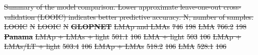 \documentclass[
  12pt,
]{article}
\providecommand{\DIFdeltex}[1]{{\protect\color{red}\sout{#1}}}                      %
\providecommand{\DIFdelbegin}{} %
\providecommand{\DIFdelend}{} %
\providecommand{\DIFdel}[1]{\texorpdfstring{\DIFdeltex{#1}}{}} %
\newcommand{\DIFscaledelfig}{0.5}
\newlength{\DIFdelgraphicswidth} %
\newlength{\DIFdelgraphicsheight} %
\newcommand{\DIFdelincludegraphics}[2][]{%
\sbox{\DIFdelgraphicsbox}{\DIFOincludegraphics[#1]{#2}}%
\settoboxwidth{\DIFdelgraphicswidth}{\DIFdelgraphicsbox} %
\settoboxtotalheight{\DIFdelgraphicsheight}{\DIFdelgraphicsbox} %
\scalebox{\DIFscaledelfig}{%
\parbox[b]{\DIFdelgraphicswidth}{\usebox{\DIFdelgraphicsbox}\\[-\baselineskip] \rule{\DIFdelgraphicswidth}{0em}}\llap{\resizebox{\DIFdelgraphicswidth}{\DIFdelgraphicsheight}{%
\setlength{\unitlength}{\DIFdelgraphicswidth}%
\begin{picture}(1,1)%
\thicklines\linethickness{2pt} %
{\color[rgb]{1,0,0}\put(0,0){\framebox(1,1){}}}%
{\color[rgb]{1,0,0}\put(0,0){\line( 1,1){1}}}%
{\color[rgb]{1,0,0}\put(0,1){\line(1,-1){1}}}%
\end{picture}%
}\hspace*{3pt}}} %
} %
\DeclareRobustCommand{\DIFdelbegin}{\DIFOdelbegin \let\includegraphics\DIFdelincludegraphics} %
\DeclareRobustCommand{\DIFdelend}{\DIFOaddend \let\includegraphics\DIFOincludegraphics} %
\begin{document}
\DIFdelbegin %
{%
\DIFdel{Summary of the model comparison. Lower approximate leave-one-out cross-validation (LOOIC) indicates better predictive accuracy. N; number of samples.}}%
\DIFdel{LOOIC }%
\DIFdel{N }%
\DIFdel{LOOIC }%
\DIFdel{N }%
\textbf{\DIFdel{GLOPNET}} %
\DIFdel{LMAp and LMAs }%
\DIFdel{746 }%
\DIFdel{198 }%
\DIFdel{LMA }%
\DIFdel{766.2 }%
\DIFdel{198 }%
\textbf{\DIFdel{Panama}} %
\DIFdel{LMAp + LMAs + light }%
\DIFdel{501.1 }%
\DIFdel{106 }%
\DIFdel{LMA + light }%
\DIFdel{503 }%
\DIFdel{106 }%
\DIFdel{LMAp + LMAs/LT + light }%
\DIFdel{503.4 }%
\DIFdel{106 }%
\DIFdel{LMAp + LMAs }%
\DIFdel{518.2 }%
\DIFdel{106 }%
\DIFdel{LMA }%
\DIFdel{528.1 }%
\DIFdel{106 }%

\DIFdelend \newpage

\hypertarget{section-1}{%
\section{}\label{section-1}}
\end{document}
